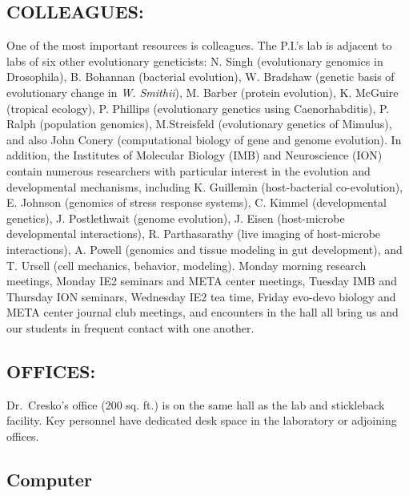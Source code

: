 \documentclass[
]{book}
\begin{document}
\hypertarget{colleagues}{%
\subsection{COLLEAGUES:}\label{colleagues}}

One of the most important resources is colleagues. The P.I.'s lab is adjacent to labs of six other evolutionary geneticists: N. Singh (evolutionary genomics in Drosophila), B. Bohannan (bacterial evolution), W. Bradshaw (genetic basis of evolutionary change in \emph{W. Smithii}), M. Barber (protein evolution), K. McGuire (tropical ecology), P. Phillips (evolutionary genetics using Caenorhabditis), P. Ralph (population genomics), M.Streisfeld (evolutionary genetics of Mimulus), and also John Conery (computational biology of gene and genome evolution). In addition, the Institutes of Molecular Biology (IMB) and Neuroscience (ION) contain numerous researchers with particular interest in the evolution and developmental mechanisms, including K. Guillemin (host-bacterial co-evolution), E. Johnson (genomics of stress response systems), C. Kimmel (developmental genetics), J. Postlethwait (genome evolution), J. Eisen (host-microbe developmental interactions), R. Parthasarathy (live imaging of host-microbe interactions), A. Powell (genomics and tissue modeling in gut development), and T. Ursell (cell mechanics, behavior, modeling). Monday morning research meetings, Monday IE2 seminars and META center meetings, Tuesday IMB and Thursday ION seminars, Wednesday IE2 tea time, Friday evo-devo biology and META center journal club meetings, and encounters in the hall all bring us and our students in frequent contact with one another.

\hypertarget{offices}{%
\subsection{OFFICES:}\label{offices}}

Dr.~Cresko's office (200 sq. ft.) is on the same hall as the lab and stickleback facility. Key personnel have dedicated desk space in the laboratory or adjoining offices.

\hypertarget{computer}{%
\subsection{Computer}\label{computer}}
\end{document}
